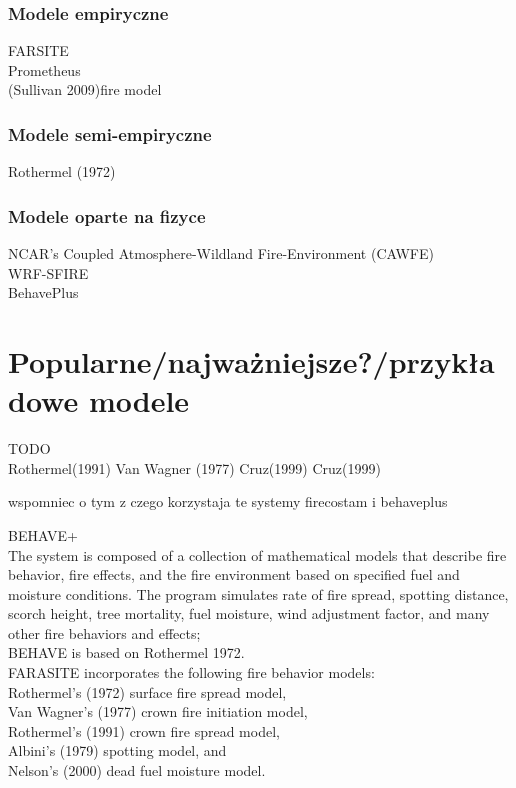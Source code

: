 \documentclass[a4paper, 11pt]{article}
\begin{document}
	\subsubsection*{Modele empiryczne}
	FARSITE\\
	Prometheus\\
	(Sullivan 2009)fire  model\\
	\subsubsection*{Modele semi-empiryczne}
	 Rothermel (1972)\\
	\subsubsection*{Modele oparte na fizyce}
	NCAR's Coupled Atmosphere-Wildland Fire-Environment (CAWFE) \\
	WRF-SFIRE\\
	BehavePlus\\
	\section* {Popularne/najważniejsze?/przykładowe modele}
	\indent
	TODO\\
	Rothermel(1991)
	Van Wagner (1977)
	Cruz(1999)
	Cruz(1999)
	

	wspomniec o tym z czego korzystaja te systemy firecostam i behaveplus

BEHAVE+\\
The system is composed of a collection of mathematical models that describe fire behavior, fire effects, and the fire environment based on specified fuel and moisture conditions. The program simulates rate of fire spread, spotting distance, scorch height, tree mortality, fuel moisture, wind adjustment factor, and many other fire behaviors and effects;\\

BEHAVE is based on Rothermel 1972.\\
FARASITE  incorporates the following fire behavior models:\\

Rothermel's (1972) surface fire spread model,\\
Van Wagner's (1977) crown fire initiation model,\\
Rothermel's (1991) crown fire spread model,\\
Albini's (1979) spotting model, and\\
Nelson's (2000) dead fuel moisture model.\\
	
\end{document}
